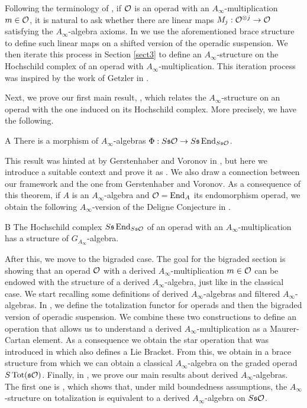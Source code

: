Following the terminology of \cite{GV}, if ${\mathcal O}$ is an operad with an $A_\infty$-multiplication $m\in{\mathcal O}$, it is natural to ask whether there are linear maps $M_j:{\mathcal O}^{\otimes j}\to {\mathcal O}$ satisfying the $A_\infty$-algebra axioms. In  we use the aforementioned brace structure to define such linear maps on a shifted version of the operadic suspension. We then iterate this process in Section \ref{sect3} to define an $A_\infty$-structure on the Hochschild complex of an operad with $A_\infty$-multiplication. This iteration process was inspired by the work of Getzler in \cite{getzler}.

Next, we prove our first main result, , which relates the $A_\infty$-structure on an operad with the one induced on its Hochschild complex. More precisely, we have the following.

\begin{manualtheorem}{A}
There is a morphism of $A_\infty$-algebras $\Phi:S\mathfrak{s}{\mathcal O}\to S\mathfrak{s}\operatorname{End}_{S\mathfrak{s}{\mathcal O}}$.
\end{manualtheorem} 
This result was hinted at by Gerstenhaber and Voronov in \cite{GV}, but here we introduce a suitable context and prove it as . We also draw a connection between our framework and the one from Gerstenhaber and Voronov. As a consequence of this theorem, if $A$ is an $A_\infty$-algebra and ${\mathcal O}=\operatorname{End}_A$ its endomorphism operad, we obtain the following $A_\infty$-version of the Deligne Conjecture in . 

\begin{manualtheorem}{B}
The Hochschild complex $S\mathfrak{s}\operatorname{End}_{S\mathfrak{s}{\mathcal O}}$ of an operad with an $A_\infty$-multiplication has a structure of $G_{A_\infty}$-algebra.
\end{manualtheorem} 

 After this, we move to the bigraded case. The goal for the bigraded section is showing that an operad ${\mathcal O}$ with a derived $A_\infty$-multiplication $m\in{\mathcal O}$ can be endowed with the structure of a derived $A_\infty$-algebra, just like in the classical case.  We start  recalling some definitions of derived $A_\infty$-algebras and filtered $A_\infty$-algebras. In , we define the totalization functor for operads and then the bigraded version of operadic suspension. We combine these two constructions to define an operation that allows us to understand a derived $A_\infty$-multiplication as a Maurer-Cartan element. As a consequence we obtain the star operation that was introduced in \cite{LRW} which also defines a Lie Bracket.  From this, we obtain in  a brace structure from which we can obtain a classical $A_\infty$-algebra on the graded operad $S\operatorname{Tot}(\mathfrak{s}{\mathcal O})$. Finally, in , we prove our main results about derived $A_\infty$-algebras. The first one is , which shows that, under mild boundedness assumptions, the $A_\infty$-structure on totalization is equivalent to a derived $A_\infty$-algebra on $S\mathfrak{s}{\mathcal O}$.
 
